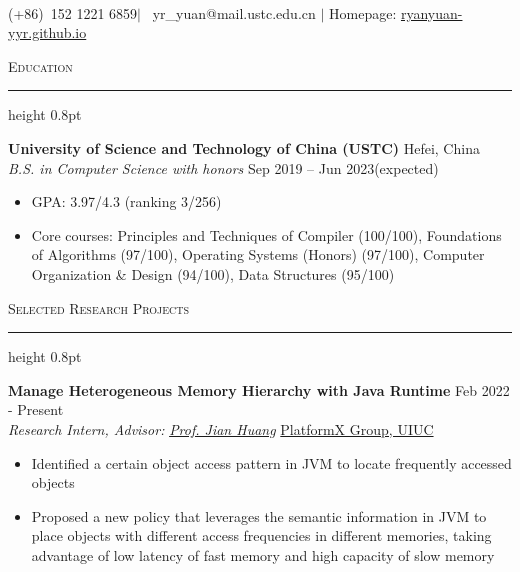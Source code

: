 \documentclass[11pt,letterpaper]{article}
\newcommand{\allnotes}[1]{\textit{#1}}
\newcommand{\alvin}[1]{\allnotes{\textcolor{purple}{[Alvin: #1]}}}
\newcommand{\myline}{\par
  \kern3pt %
  \hrule height 0.8pt
  \kern5pt %
}
\newenvironment{ssubtitle}{\fontfamily{ptm}\selectfont}{}
\newcommand{\subtitle}[1]{\Large{\textsc{#1}}}
\newenvironment{headd}{\fontfamily{put}\selectfont}{}
\begin{document}
\pagestyle{empty}
\begin{center}
\begin{headd}{\huge\textbf{\textrm{YuRun Yuan}}}\end{headd}\\
\normalsize
\vspace{3pt}
 (+86)~152 1221 6859$|$~ yr\_yuan@mail.ustc.edu.cn
$|$ Homepage: \href{https://ryanyuan-yyr.github.io/}{ryanyuan-yyr.github.io}
\end{center}

\noindent
\begin{ssubtitle}\subtitle{Education}\end{ssubtitle}
\myline

\noindent
{\textbf{University of Science and Technology of China (USTC)} \hfill Hefei, China}\\
\textit{B.S. in Computer Science with honors} \hfill Sep 2019 -- Jun 2023(expected) 
\begin{itemize}[noitemsep, topsep=0pt, leftmargin=11pt]
\item GPA: 3.97/4.3 (ranking 3/256)
\item Core courses: Principles and Techniques of Compiler (100/100), Foundations of Algorithms (97/100), Operating Systems (Honors) (97/100), Computer Organization \& Design (94/100), Data Structures (95/100)
\end{itemize}

\vspace{8pt}\noindent
\begin{ssubtitle}\subtitle{Selected Research Projects}\end{ssubtitle}
\myline

\noindent
\textbf{Manage Heterogeneous Memory Hierarchy with Java Runtime} \hfill Feb 2022 - Present\\ 
\textit{Research Intern, Advisor:} \href{http://jianh.web.engr.illinois.edu/}{\textit{Prof. Jian Huang}} \hfill {\href{http://jianh.web.engr.illinois.edu/platformx/}{PlatformX Group, UIUC}}
\begin{itemize}[noitemsep, topsep=0pt, leftmargin=11pt]
        \item Identified a certain object access pattern in JVM to locate frequently accessed objects
        \item Proposed a new policy that leverages the semantic information in JVM to place objects with different access frequencies in different memories, taking advantage of low latency of fast memory and high capacity of slow memory
\end{itemize}
\end{document}

